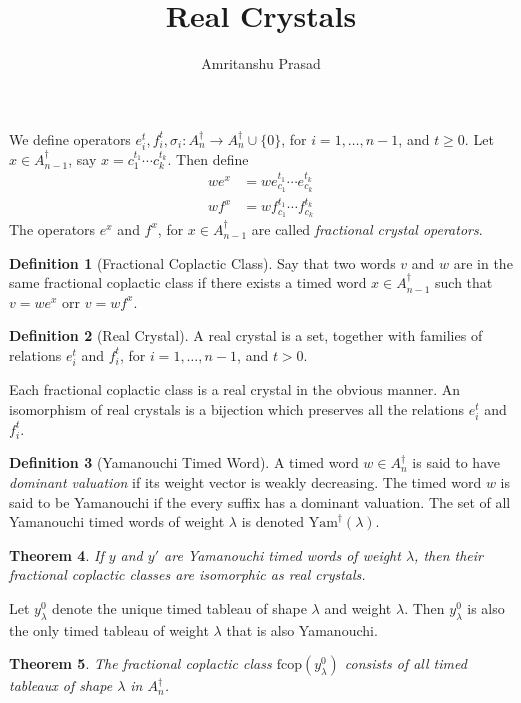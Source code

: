 \documentclass[12pt]{amsproc}
\title{Real Crystals}
\author{Amritanshu Prasad}
\newcommand{\Yam}{\mathrm{Yam}}
\newcommand{\fcop}{\mathrm{fcop}}
\newtheorem{theorem}{Theorem}
\theoremstyle{definition}
\newtheorem{definition}[theorem]{Definition}
\begin{document}
\maketitle
We define operators $e_i^t, f_i^t, \sigma_i:A_n^\dagger\to A_n^\dagger\cup \{0\}$, for $i=1,\dotsc,n-1$, and $t\geq 0$.
Let $x\in A_{n-1}^\dagger$, say $x=c_1^{t_1}\dotsb c_k^{t_k}$.
Then define
\begin{align*}
  we^x & = w e_{c_1}^{t_1}\dotsb e_{c_k}^{t_k}\\
  w f^x & = w f_{c_1}^{t_1}\dotsb f_{c_k}^{t_k}
\end{align*}
The operators $e^x$ and $f^x$, for $x\in A_{n-1}^\dagger$ are called \emph{fractional crystal operators}.
\begin{definition}[Fractional Coplactic Class]
  Say that two words $v$ and $w$ are in the same fractional coplactic class if there exists a timed word $x\in A_{n-1}^\dagger$ such that $v=we^x$ orr $v=wf^x$.
\end{definition}
\begin{definition}[Real Crystal]
  A real crystal is a set, together with families of relations $e_i^t$ and $f_i^t$, for $i=1,\dotsc,n-1$, and $t>0$.
\end{definition}
Each fractional coplactic class is a real crystal in the obvious manner.
An isomorphism of real crystals is a bijection which preserves all the relations $e_i^t$ and $f_i^t$.
\begin{definition}
  [Yamanouchi Timed Word]
  A timed word $w\in A_n^\dagger$ is said to have \emph{dominant valuation} if its weight vector is weakly decreasing.
  The timed word $w$ is said to be Yamanouchi if the every suffix has a dominant valuation.
  The set of all Yamanouchi timed words of weight $\lambda$ is denoted $\Yam^\dagger(\lambda)$.
\end{definition}
\begin{theorem}
  If $y$ and $y'$ are Yamanouchi timed words of weight $\lambda$, then their fractional coplactic classes are isomorphic as real crystals.
\end{theorem}
Let $y^0_\lambda$ denote the unique timed tableau of shape $\lambda$ and weight $\lambda$.
Then $y^0_\lambda$ is also the only timed tableau of weight $\lambda$ that is also Yamanouchi.
\begin{theorem}
  The fractional coplactic class $\fcop(y^0_\lambda)$ consists of all timed tableaux of shape $\lambda$ in $A_n^\dagger$.
\end{theorem}
\end{document}
